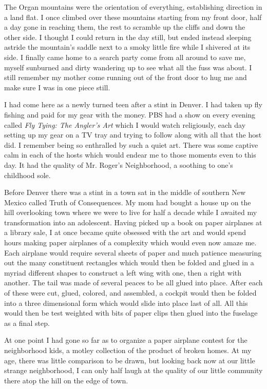 \documentclass[ebook, 10pt, openright, onecolumn]{memoir}
\newcommand*\td[1]{
  \todo[inline]{
     #1 
  }
}
\newcommand*\finish{\td{ ----- Finish this section -----}}
\begin{document}
The Organ mountains were the orientation of everything, establishing direction
in a land flat.  I once climbed over these mountains starting from my front
door, half a day gone in reaching them, the rest to scramble up the cliffs and
down the other side.  I thought I could return in the day still, but ended
instead sleeping astride the mountain's saddle next to a smoky little fire while
I shivered at its side.  I finally came home to a search party come from all
around to save me, myself sunburned and dirty wandering up to see what all the
fuss was about.  I still remember my mother come running out of the front door
to hug me and make sure I was in one piece still.

\finish

I had come here as a newly turned teen after a stint in Denver.  I had taken up
fly fishing and paid for my gear with the money.  PBS had a show on every
evening called \textit{Fly Tying: The Angler's Art} which I would watch
religiously, each day setting up my gear on a TV tray and trying to follow along
with all that the host did.  I remember being so enthralled by such a quiet
art.  There was some captive calm in each of the hosts which would endear me to
those moments even to this day.  It had the quality of Mr. Roger's Neighborhood,
a soothing to one's childhood sole.

Before Denver there was a stint in a town sat in the middle of southern New
Mexico called Truth of Consequences.  My mom had bought a house up on the hill
overlooking town where we were to live for half a decade while I awaited my
transformation into an adolescent.  Having picked up a book on paper airplanes
at a library sale, I at once became quite obsessed with the art and would spend
hours making paper airplanes of a complexity which would even now amaze me.
Each airplane would require several sheets of paper and much patience measuring
out the many constituent rectangles which would then be folded and glued in a
myriad different shapes to construct a left wing with one, then a right with
another.  The tail was made of several peaces to be all glued into place.  After
each of these were cut, glued, colored, and assembled, a cockpit would then be
folded into a three dimensional form which would slide into place last of all.
All this would then be test weighted with bits of paper clips then glued into
the fuselage as a final step.

At one point I had gone so far as to organize a paper airplane contest for the
neighborhood kids, a motley collection of the product of broken homes.  At my
age, there was little comparison to be drawn, but looking back now at our little
strange neighborhood, I can only half laugh at the quality of our little
community there atop the hill on the edge of town.
\end{document}
